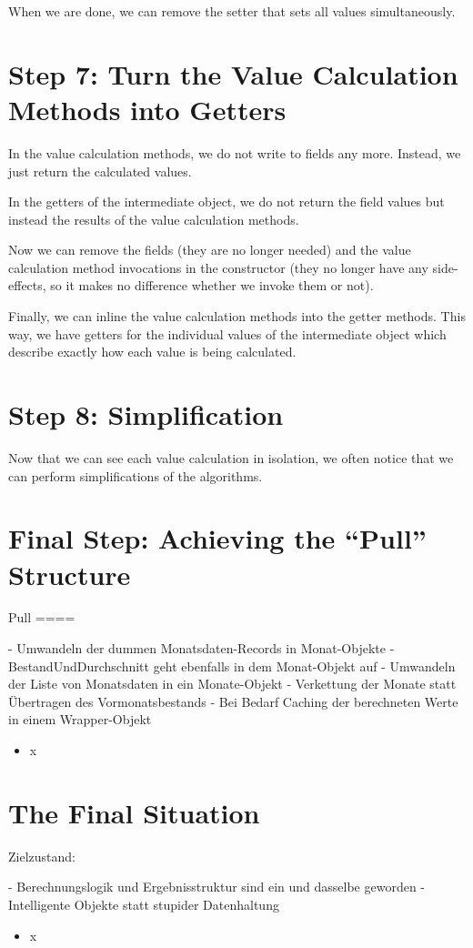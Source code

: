 \documentclass[a4paper,fleqn,titlepage,11pt]{article}
\begin{document}
When we are done, we can remove the setter that sets all values simultaneously.

\section{Step 7: Turn the Value Calculation Methods into Getters}

In the value calculation methods, we do not write to fields any more. Instead, we just return the calculated values.

In the getters of the intermediate object, we do not return the field values but instead the results of the value calculation methods.

Now we can remove the fields (they are no longer needed) and the value calculation method invocations in the constructor (they no longer have any side-effects, so it makes no difference whether we invoke them or not).

Finally, we can inline the value calculation methods into the getter methods. This way, we have getters for the individual values of the intermediate object which describe exactly how each value is being calculated.

\section{Step 8: Simplification}

Now that we can see each value calculation in isolation, we often notice that we can perform simplifications of the algorithms. 

\section{Final Step: Achieving the ``Pull'' Structure}



Pull
====

- Umwandeln der dummen Monatsdaten-Records in Monat-Objekte
- BestandUndDurchschnitt geht ebenfalls in dem Monat-Objekt auf
- Umwandeln der Liste von Monatsdaten in ein Monate-Objekt
- Verkettung der Monate statt Übertragen des Vormonatsbestands
- Bei Bedarf Caching der berechneten Werte in einem Wrapper-Objekt

\begin{itemize}
\item x
\end{itemize}

\section{The Final Situation}

Zielzustand:

- Berechnungslogik und Ergebnisstruktur sind ein und dasselbe geworden
- Intelligente Objekte statt stupider Datenhaltung

\begin{itemize}
\item x
\end{itemize}
\end{document}
